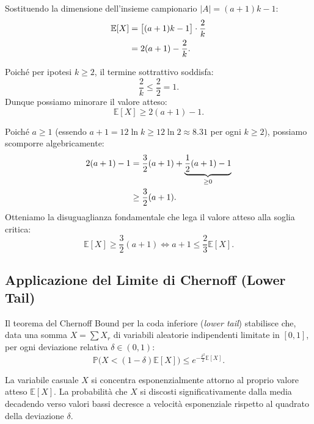 Sostituendo la dimensione dell'insieme campionario $|A| = (a + 1)k - 1$:
\begin{align}
  \mathbb{E}[X] &= \big[(a + 1)k - 1\big] \cdot \frac{2}{k} \notag\\
  &= 2(a + 1) - \frac{2}{k}.
\end{align}

Poiché per ipotesi $k \ge 2$, il termine sottrattivo soddisfa:
\begin{equation}
  \frac{2}{k} \le \frac{2}{2} = 1.
\end{equation}
Dunque possiamo minorare il valore atteso:
\begin{equation}
  \mathbb{E}[X] \ge 2(a + 1) - 1.
\end{equation}

Poiché $a \ge 1$ (essendo $a + 1 = 12 \ln k \ge 12 \ln 2 \approx 8.31$ per ogni $k \ge 2$), possiamo scomporre algebricamente:
\begin{align}
  2(a + 1) - 1 &= \frac{3}{2}(a + 1) + \underbrace{\frac{1}{2}(a + 1) - 1}_{\ge 0} \notag\\
  &\ge \frac{3}{2}(a + 1).
\end{align}
Otteniamo la disuguaglianza fondamentale che lega il valore atteso alla soglia critica:
\begin{equation}
  \mathbb{E}[X] \ge \frac{3}{2}(a + 1) \iff a + 1 \le \frac{2}{3}\mathbb{E}[X].
  \label{eq:expectation-lower-bound}
\end{equation}

\subsection{Applicazione del Limite di Chernoff (Lower Tail)}
Il teorema del Chernoff Bound per la coda inferiore (\textit{lower tail}) stabilisce che, data una somma $X = \sum X_r$ di variabili aleatorie indipendenti limitate in $[0, 1]$, per ogni deviazione relativa $\delta \in (0, 1)$:
\begin{equation}
  \mathbb{P}\big(X < (1 - \delta)\mathbb{E}[X]\big) \le e^{-\frac{\delta^2}{2}\mathbb{E}[X]}.
  \label{eq:chernoff-lower-tail-theorem}
\end{equation}

\begin{property}
La variabile casuale $X$ si concentra esponenzialmente attorno al proprio valore atteso $\mathbb{E}[X]$. La probabilità che $X$ si discosti significativamente dalla media decadendo verso valori bassi decresce a velocità esponenziale rispetto al quadrato della deviazione $\delta$.
\end{property}

